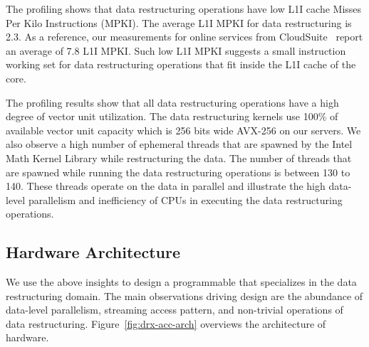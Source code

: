 The profiling shows that data restructuring operations have low L1I cache Misses Per Kilo Instructions (MPKI). The average L1I MPKI for data restructuring is 2.3. As a reference, our measurements for online services from CloudSuite~\cite{noauthor_cloudsuite_nodate} report an average of 7.8 L1I MPKI. 
Such low L1I MPKI suggests a small instruction working set for data restructuring operations that fit inside the L1I cache of the core. 


The profiling results show that all data restructuring operations have a high degree of vector unit utilization. The data restructuring kernels use 100\% of available vector unit capacity which is 256 bits wide AVX-256 on our servers. 
We also observe a high number of ephemeral threads that are spawned by the Intel Math Kernel Library while restructuring the data. The number of threads that are spawned while running the data restructuring operations is between 130 to 140. These threads operate on the data in parallel and illustrate the high data-level parallelism and inefficiency of CPUs in executing the data restructuring operations.

\subsection{\drx Hardware Architecture}
We use the above insights to design a programmable \drx that specializes in the data restructuring domain.
%
The main observations driving \drx design are the abundance of data-level parallelism, streaming access pattern, and non-trivial operations of data restructuring. Figure~\ref{fig:drx-acc-arch} overviews the architecture of \drx hardware.
%

